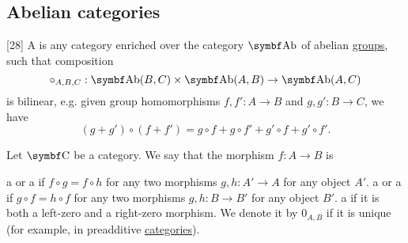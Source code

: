 \subsection{Abelian categories}\label{subsec:abelian_categories}

\begin{definition}\label{def:preadditive_category}\cite{MacLane1994}[28]
  A  is any category enriched over the category \( \Cat{Ab} \) of abelian \hyperref[thm:ab_is_abelian]{groups}, such that composition
  \begin{equation*}
    \circ_{A,B,C}: \Cat{Ab}(B, C) \times \Cat{Ab}(A, B) \to \Cat{Ab}(A, C)
  \end{equation*}
  is bilinear, e.g. given group homomorphisms \( f, f': A \to B \) and \( g, g': B \to C \), we have
  \begin{equation*}
    (g + g') \circ (f + f') = g \circ f + g \circ f' + g' \circ f + g' \circ f'.
  \end{equation*}
\end{definition}

\begin{definition}\label{def:zero_morphism}
  Let \( \Cat{C} \) be a category. We say that the morphism \( f: A \to B \) is
  \begin{defenum}
     a  or a  if \( f \circ g = f \circ h \) for any two morphisms \( g, h: A' \to A \) for any object \( A' \).
     a  or a  if \( g \circ f = h \circ f \) for any two morphisms \( g, h: B \to B' \) for any object \( B' \).
     a  if it is both a left-zero and a right-zero morphism. We denote it by \( 0_{A,B} \) if it is unique (for example, in preadditive \hyperref[def:preadditive_category]{categories}).
  \end{defenum}
\end{definition}

